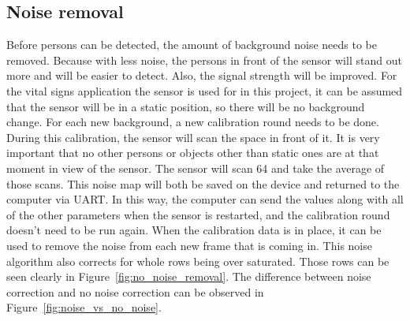 \subsection{Noise removal}
Before persons can be detected, the amount of background noise needs to be removed. Because with less noise, the persons in front of the sensor will stand out more and will be easier to detect. Also, the signal strength will be improved. For the vital signs application the sensor is used for in this project, it can be assumed that the sensor will be in a static position, so there will be no background change. For each new background, a new calibration round needs to be done. During this calibration, the sensor will scan the space in front of it. It is very important that no other persons or objects other than static ones are at that moment in view of the sensor. The sensor will scan 64 and take the average of those scans. This noise map will both be saved on the device and returned to the computer via UART. In this way, the computer can send the values along with all of the other parameters when the sensor is restarted, and the calibration round doesn't need to be run again. When the calibration data is in place, it can be used to remove the noise from each new frame that is coming in. This noise algorithm also corrects for whole rows being over saturated. Those rows can be seen clearly in Figure~\ref{fig:no_noise_removal}. The difference between noise correction and no noise correction can be observed in Figure~\ref{fig:noise_vs_no_noise}.

